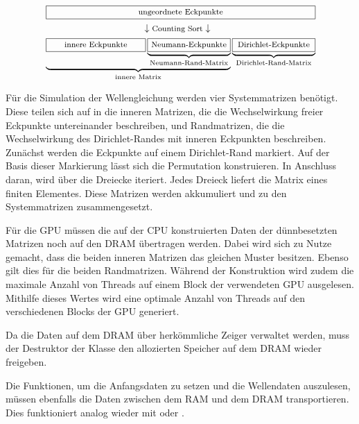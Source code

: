 \documentclass[crop=false,10pt,ngerman]{standalone}
\begin{document}
      \begin{align*}
        &\,\framebox[0.81\textwidth]{\footnotesize ungeordnete Eckpunkte} \\
        &\makebox[0.81\textwidth]{\hfill $\downarrow \text{\footnotesize Counting Sort} \downarrow$ \hfill}\\
        & \underbrace{\framebox[0.3\textwidth]{\footnotesize innere Eckpunkte}\underbrace{\framebox[0.25\textwidth]{\footnotesize Neumann-Eckpunkte}}_{\text{Neumann-Rand-Matrix}}}_{\text{innere Matrix}} \underbrace{\framebox[0.25\textwidth]{\footnotesize Dirichlet-Eckpunkte}}_{\text{Dirichlet-Rand-Matrix}}
      \end{align*}

      Für die Simulation der Wellengleichung werden vier Systemmatrizen benötigt.
      Diese teilen sich auf in die inneren Matrizen, die die Wechselwirkung freier Eckpunkte untereinander beschreiben, und Randmatrizen, die die Wechselwirkung des Dirichlet-Randes mit inneren Eckpunkten beschreiben.
      Zunächst werden die Eckpunkte auf einem Dirichlet-Rand markiert.
      Auf der Basis dieser Markierung lässt sich die Permutation konstruieren.
      In Anschluss daran, wird über die Dreiecke iteriert.
      Jedes Dreieck liefert die Matrix eines finiten Elementes.
      Diese Matrizen werden akkumuliert und zu den Systemmatrizen zusammengesetzt.

      Für die GPU müssen die auf der CPU konstruierten Daten der dünnbesetzten Matrizen noch auf den DRAM übertragen werden.
      Dabei wird sich zu Nutze gemacht, dass die beiden inneren Matrizen das gleichen Muster besitzen.
      Ebenso gilt dies für die beiden Randmatrizen.
      Während der Konstruktion wird zudem die maximale Anzahl von Threads auf einem Block der verwendeten GPU ausgelesen.
      Mithilfe dieses Wertes wird eine optimale Anzahl von Threads auf den verschiedenen Blocks der GPU generiert.

      Da die Daten auf dem DRAM über herkömmliche Zeiger verwaltet werden, muss der Destruktor der Klasse den allozierten Speicher auf dem DRAM wieder freigeben.

      Die Funktionen, um die Anfangsdaten zu setzen und die Wellendaten auszulesen, müssen ebenfalls die Daten zwischen dem RAM und dem DRAM transportieren.
      Dies funktioniert analog wieder mit  oder .
\end{document}
